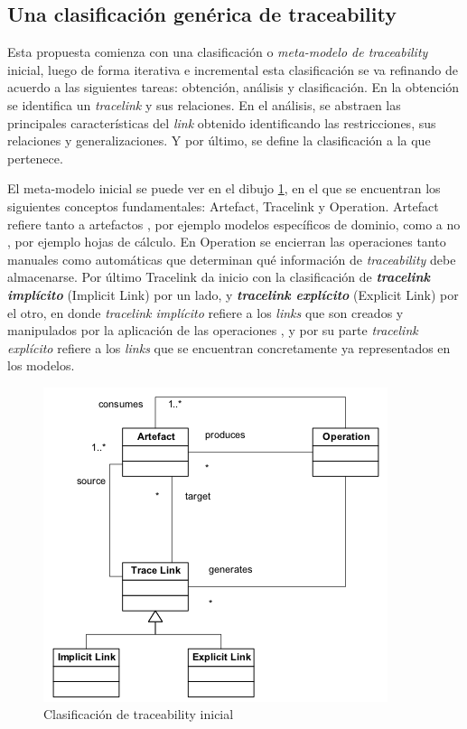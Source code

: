\documentclass[a4paper,12pt,twoside,spanish,openright]{book}
\begin{document}
\subsection{Una clasificación genérica de traceability}
\label{sec:ClasificacionTraceability}


Esta propuesta comienza con una clasificación o \textit{meta-modelo de traceability} inicial, luego de forma iterativa e incremental esta clasificación se va refinando de acuerdo a las siguientes tareas: obtención, análisis y clasificación. En la obtención se identifica un \textit{tracelink} y sus relaciones. En el análisis, se abstraen las principales características del \textit{link} obtenido identificando las restricciones, sus relaciones y generalizaciones. Y por último, se define la clasificación a la que pertenece.

El meta-modelo inicial se puede ver en el dibujo \ref{fig:ClasifInicial}, en el que se encuentran los siguientes conceptos fundamentales: \textsf{Artefact}, \textsf{Tracelink} y \textsf{Operation}. \textsf{Artefact} refiere tanto a artefactos , por ejemplo modelos específicos de dominio, como a no , por ejemplo hojas de cálculo. En \textsf{Operation} se encierran las operaciones tanto manuales como automáticas que determinan qué información de \textit{traceability} debe almacenarse. Por último \textsf{Tracelink} da inicio con la clasificación de \textit{\textbf{tracelink implícito}} (\textsf{Implicit Link}) por un lado, y \textit{\textbf{tracelink explícito}} (\textsf{Explicit Link}) por el otro, en donde \textit{tracelink implícito} refiere a los \textit{links} que son creados y manipulados por la aplicación de las operaciones , y por su parte \textit{tracelink explícito} refiere a los \textit{links} que se encuentran concretamente ya representados en los modelos.


\begin{figure}[hbtp]
\centering
\includegraphics[scale=1.05]{./img/ExplicitImplicitTraceLinkClassification}
\caption{Clasificación de traceability inicial}
\label{fig:ClasifInicial}
\end{figure}
\end{document}
